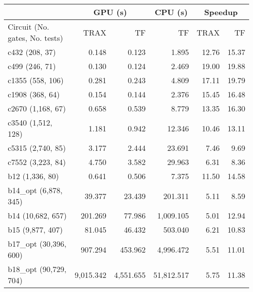 \begin{table}[hbtp]
\centering
\begin{tabular*}{1.0\columnwidth}{@{\extracolsep{\fill}}|l|rr|r|rr|}
\hline
                                &\multicolumn{2}{c|}{GPU (s)}       &\multicolumn{1}{c|}{CPU (s)}   &\multicolumn{2}{c|}{Speedup}\\
\hline
Circuit (No. gates, No. tests)  &TRAX       &TF                     &TF                             &TRAX   &TF\\
\hline
c432 (208, 37)                  &0.148      &0.123                  &1.895                          &12.76  &15.37\\
c499 (246, 71)                  &0.130      &0.124                  &2.469                          &19.00  &19.88\\
c1355 (558, 106)                &0.281      &0.243                  &4.809                          &17.11  &19.79\\
c1908 (368, 64)                 &0.154      &0.144                  &2.376                          &15.45  &16.48\\
c2670 (1,168, 67)               &0.658      &0.539                  &8.779                          &13.35  &16.30\\
c3540 (1,512, 128)              &1.181      &0.942                  &12.346                         &10.46  &13.11\\
c5315 (2,740, 85)               &3.177      &2.444                  &23.691                         &7.46   &9.69\\
c7552 (3,223, 84)               &4.750      &3.582                  &29.963                         &6.31   &8.36\\
\hline
b12 (1,336, 80)                 &0.641      &0.506                  &7.375                          &11.50  &14.58\\
b14\_opt (6,878, 345)           &39.377     &23.439                 &201.311                        &5.11   &8.59\\
b14 (10,682, 657)               &201.269    &77.986                 &1,009.105                      &5.01   &12.94\\
b15 (9,877, 407)                &81.045     &46.432                 &503.040                        &6.21   &10.83\\
b17\_opt (30,396, 600)          &907.294    &453.962                &4,996.472                      &5.51   &11.01\\
b18\_opt (90,729, 704)          &9,015.342  &4,551.655              &51,812.517                     &5.75   &11.38\\

\end{tabular*}
\end{table}

